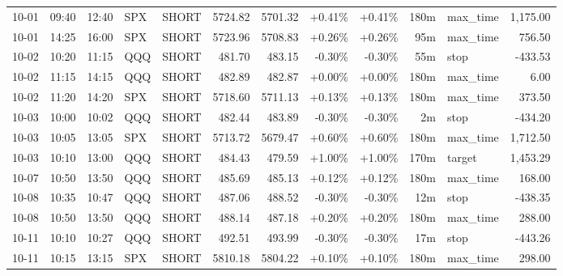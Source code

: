 \documentclass[11pt,a4paper,twoside]{article}
\begin{document}
\begin{center}
\begin{longtable}{>{\color{txtmain}}l l l l l r r r r r >{\color{txtmain}}l r}
10-01 & 09:40 & 12:40 & SPX & SHORT & 5724.82 & 5701.32 & \textcolor{wingreen}{+0.41\%} & \textcolor{wingreen}{+0.41\%} & 180m & max\_time & \textcolor{wingreen}{1,175.00} \\
10-01 & 14:25 & 16:00 & SPX & SHORT & 5723.96 & 5708.83 & \textcolor{wingreen}{+0.26\%} & \textcolor{wingreen}{+0.26\%} & 95m & max\_time & \textcolor{wingreen}{756.50} \\
10-02 & 10:20 & 11:15 & QQQ & SHORT & 481.70 & 483.15 & \textcolor{lossred}{-0.30\%} & \textcolor{lossred}{-0.30\%} & 55m & stop & \textcolor{lossred}{-433.53} \\
10-02 & 11:15 & 14:15 & QQQ & SHORT & 482.89 & 482.87 & \textcolor{wingreen}{+0.00\%} & \textcolor{wingreen}{+0.00\%} & 180m & max\_time & \textcolor{wingreen}{6.00} \\
10-02 & 11:20 & 14:20 & SPX & SHORT & 5718.60 & 5711.13 & \textcolor{wingreen}{+0.13\%} & \textcolor{wingreen}{+0.13\%} & 180m & max\_time & \textcolor{wingreen}{373.50} \\
10-03 & 10:00 & 10:02 & QQQ & SHORT & 482.44 & 483.89 & \textcolor{lossred}{-0.30\%} & \textcolor{lossred}{-0.30\%} & 2m & stop & \textcolor{lossred}{-434.20} \\
10-03 & 10:05 & 13:05 & SPX & SHORT & 5713.72 & 5679.47 & \textcolor{wingreen}{+0.60\%} & \textcolor{wingreen}{+0.60\%} & 180m & max\_time & \textcolor{wingreen}{1,712.50} \\
10-03 & 10:10 & 13:00 & QQQ & SHORT & 484.43 & 479.59 & \textcolor{wingreen}{+1.00\%} & \textcolor{wingreen}{+1.00\%} & 170m & target & \textcolor{wingreen}{1,453.29} \\
10-07 & 10:50 & 13:50 & QQQ & SHORT & 485.69 & 485.13 & \textcolor{wingreen}{+0.12\%} & \textcolor{wingreen}{+0.12\%} & 180m & max\_time & \textcolor{wingreen}{168.00} \\
10-08 & 10:35 & 10:47 & QQQ & SHORT & 487.06 & 488.52 & \textcolor{lossred}{-0.30\%} & \textcolor{lossred}{-0.30\%} & 12m & stop & \textcolor{lossred}{-438.35} \\
10-08 & 10:50 & 13:50 & QQQ & SHORT & 488.14 & 487.18 & \textcolor{wingreen}{+0.20\%} & \textcolor{wingreen}{+0.20\%} & 180m & max\_time & \textcolor{wingreen}{288.00} \\
10-11 & 10:10 & 10:27 & QQQ & SHORT & 492.51 & 493.99 & \textcolor{lossred}{-0.30\%} & \textcolor{lossred}{-0.30\%} & 17m & stop & \textcolor{lossred}{-443.26} \\
10-11 & 10:15 & 13:15 & SPX & SHORT & 5810.18 & 5804.22 & \textcolor{wingreen}{+0.10\%} & \textcolor{wingreen}{+0.10\%} & 180m & max\_time & \textcolor{wingreen}{298.00} \\

\end{longtable}
\end{center}
\end{document}
